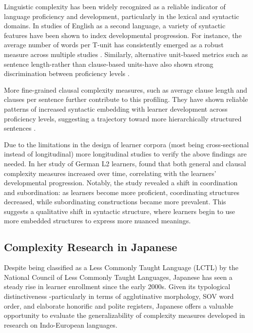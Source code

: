 Linguistic complexity has been widely recognized as a reliable indicator of language proficiency and development,
particularly in the lexical and syntactic domains. In studies of English as a second language, a variety of syntactic
features have been shown to index developmental
progression. For instance, the average number of words per T-unit has consistently emerged as a robust measure
across multiple studies \citep{Ortega2003,Wolfe1998,Lu2011, Lu2010, Iwashita2006}. Similarly, alternative unit-based
metrics such as sentence length-rather than clause-based units-have also shown strong discrimination between
proficiency levels \citep{Ortega2003, Lu2011}.

More fine-grained clausal complexity measures, such as average clause length and clauses per sentence further
contribute to this profiling. They have shown reliable patterns of increased syntactic embedding with learner
development across proficiency levels, suggesting a trajectory toward more hierarchically structured sentences \citep{Ortega2003, Lu2011}.

Due to the limitations in the design of learner corpora (most being cross-sectional instead of longitudinal) more
longitudinal studies to verify the above findings are needed. In her study of German L2 learners, \citet{Vyatkina2012}
found
that both general and clausal complexity measures increased over time, correlating with the learners' developmental
progression. Notably, the study revealed a shift in coordination and subordination: as learners become more
proficient, coordinating structures decreased, while subordinating constructions became more prevalent. This suggests
a qualitative shift in syntactic structure, where learners begin to use more embedded structures to express more
nuanced
meanings.


\subsection{Complexity Research in Japanese}
Despite being classified as a Less Commonly Taught Language (LCTL) by the National Council of Less Commonly Taught
Languages, Japanese has seen a steady rise in learner enrollment since the early 2000s. Given its
typological distinctiveness -particularly in terms of agglutinative morphology, SOV word order, and elaborate
honorific and polite registers, Japanese offers a valuable opportunity to evaluate the generalizability of
complexity measures developed in research on Indo-European languages.

